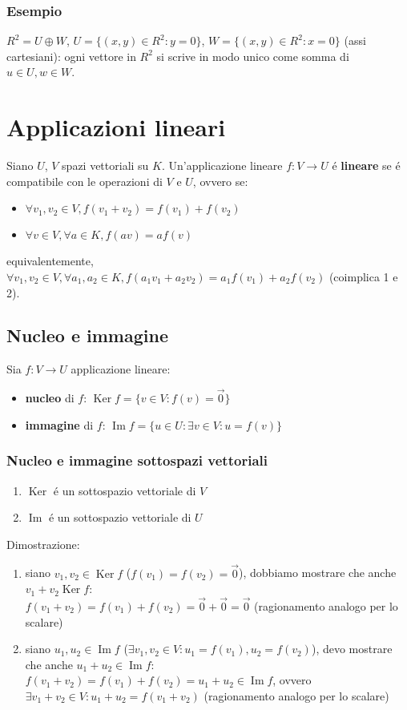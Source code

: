 \documentclass{article}
\DeclareMathOperator{\Ker}{Ker}
\DeclareMathOperator{\Ima}{Im}
\begin{document}
\subsubsection{Esempio}
$R^2 = U \oplus W$, $U = \{(x,y) \in R^2 : y = 0\}$, $W = \{(x,y) \in R^2 : x = 0\}$ (assi cartesiani): ogni vettore in $R^2$ si scrive in modo unico come somma di $u \in U, w \in W$.

\section{Applicazioni lineari}
Siano $U$, $V$ spazi vettoriali su $K$. Un'applicazione lineare $f : V \to U$ é \textbf{lineare} se é compatibile con le operazioni di $V$ e $U$, ovvero se:
\begin{itemize}
	\item $\forall v_1, v_2 \in V, f(v_1 + v_2) = f(v_1) + f(v_2)$
	\item $\forall v \in V, \forall a \in K, f(av) = af(v)$
\end{itemize}
equivalentemente, $\forall v_1, v_2 \in V, \forall a_1, a_2 \in K, f(a_1v_1 + a_2v_2) = a_1f(v_1) + a_2f(v_2)$ (coimplica 1 e 2).

\subsection{Nucleo e immagine}
Sia $f : V \to U$ applicazione lineare:
\begin{itemize}
	\item[] \textbf{nucleo} di $f$: $\Ker{f} = \{v \in V : f(v) = \vec{0}\}$
	\item[] \textbf{immagine} di $f$: $\Ima{f} = \{u \in U : \exists v \in V : u = f(v)\}$
\end{itemize}

\subsubsection{Nucleo e immagine sottospazi vettoriali}
\begin{enumerate}
	\item $\Ker$ é un sottospazio vettoriale di $V$
	\item $\Ima$ é un sottospazio vettoriale di $U$
\end{enumerate}
Dimostrazione:
\begin{enumerate}
	\item siano $v_1, v_2 \in \Ker{f}$ ($f(v_1) = f(v_2) = \vec{0}$), dobbiamo mostrare che anche $v_1 + v_2 \Ker{f}$:\\
	$f(v_1 + v_2) = f(v_1) + f(v_2) = \vec{0} + \vec{0} = \vec{0}$ (ragionamento analogo per lo scalare)
	\item siano $u_1, u_2 \in \Ima{f}$ ($\exists v_1, v_2 \in V : u_1 = f(v_1), u_2 = f(v_2)$), devo mostrare che anche $u_1 + u_2 \in \Ima{f}$:\\
	$f(v_1 + v_2) = f(v_1) + f(v_2) = u_1 + u_2 \in \Ima{f}$, ovvero $\exists v_1 + v_2 \in V : u_1 + u_2 = f(v_1 + v_2)$ (ragionamento analogo per lo scalare)
\end{enumerate}
\end{document}
